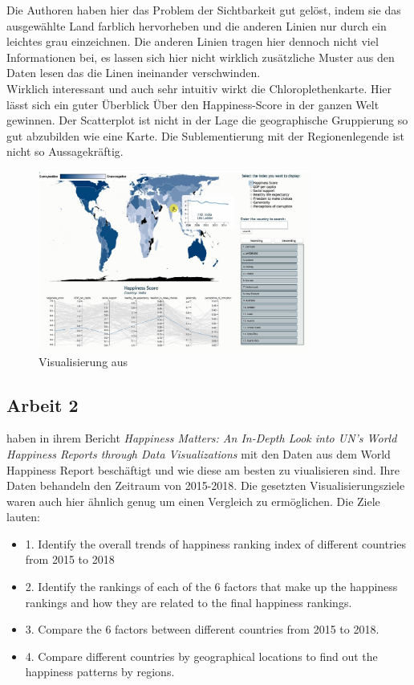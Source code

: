 Die Authoren haben hier das Problem der Sichtbarkeit gut gelöst, indem sie das ausgewählte Land farblich hervorheben und die anderen Linien nur durch ein leichtes grau einzeichnen. Die anderen Linien tragen hier dennoch nicht viel Informationen bei, es lassen sich hier nicht wirklich zusätzliche Muster aus den Daten lesen das die Linen ineinander verschwinden.\\

Wirklich interessant und auch sehr intuitiv wirkt die Chloroplethenkarte. Hier lässt sich ein guter Überblick Über den Happiness-Score in der ganzen Welt gewinnen. Der Scatterplot ist nicht in der Lage die geographische Gruppierung so gut abzubilden wie eine Karte. Die Sublementierung mit der Regionenlegende ist nicht so Aussagekräftig. \\

\cite{bazurto2019}
\begin{figure}[h]
 \centering
 \includegraphics[width = 0.8\textwidth]{img/bazurto_vis.jpg}
 \caption{Visualisierung aus \textcite{bazurto2019}}
 \label{fig:bazurto}
\end{figure}

\subsection{Arbeit 2}

\textcite{happiness_2018} haben in ihrem Bericht \textit{Happiness Matters: An In-Depth Look into UN’s World Happiness Reports through Data Visualizations} mit den Daten aus dem World Happiness Report beschäftigt und wie diese am besten zu viualisieren sind. Ihre Daten behandeln den Zeitraum von 2015-2018. Die gesetzten Visualisierungsziele waren auch hier ähnlich genug um einen Vergleich zu ermöglichen. Die Ziele lauten: \\

\begin{itemize}
    \item 1. Identify the overall trends of happiness ranking index of different countries from 2015 to 2018
    \item 2. Identify the rankings of each of the 6 factors that make up the happiness rankings and how they are related to the final happiness rankings.
    \item 3. Compare the 6 factors between different countries from 2015 to 2018.
    \item 4. Compare different countries by geographical locations to find out the happiness patterns by regions.
\end{itemize}

